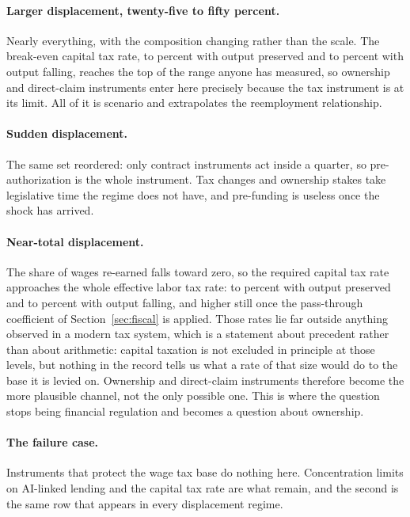 \paragraph{Larger displacement, twenty-five to fifty percent.} Nearly everything, with the
composition changing rather than the scale. The break-even capital tax rate, 
to  percent with output preserved and  to
 percent with output falling, reaches the top of the range anyone has
measured, so ownership and direct-claim instruments enter here precisely because the tax
instrument is at its limit. All of it is scenario and extrapolates the reemployment
relationship.

\paragraph{Sudden displacement.} The same set reordered: only contract instruments act inside a
quarter, so pre-authorization is the whole instrument. Tax changes and ownership stakes take
legislative time the regime does not have, and pre-funding is useless once the shock has arrived.

\paragraph{Near-total displacement.} The share of wages re-earned falls toward zero, so the
required capital tax rate approaches the whole effective labor tax rate:  to
 percent with output preserved and  to
 percent with output falling, and higher still once the pass-through
coefficient of Section~\ref{sec:fiscal} is applied. Those rates lie far outside anything observed
in a modern tax system, which is a statement about precedent rather than about arithmetic:
capital taxation is not excluded in principle at those levels, but nothing in the record tells us
what a rate of that size would do to the base it is levied on. Ownership and direct-claim
instruments therefore become the more plausible channel, not the only possible one. This is where
the question stops being financial regulation and becomes a question about ownership.

\paragraph{The failure case.} Instruments that protect the wage tax base do nothing here.
Concentration limits on AI-linked lending and the capital tax rate are what remain, and the second
is the same row that appears in every displacement regime.

